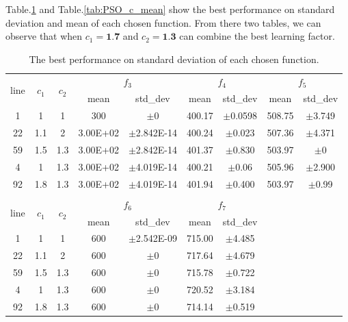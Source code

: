 \documentclass[letterpaper,12pt]{article}
\begin{document}
\par Table.\ref{tab:PSO_c_std} and Table.\ref{tab:PSO_c_mean} show the best performance on standard deviation and mean of each chosen function. From there two tables, we can observe that when $c_1 = \textbf{1.7}$ and $c_2 = \textbf{1.3}$ can combine the best learning factor.
\newpage
\begin{table}[!htb]
\centering
\begin{tabular}{|c|c|c|c|c|c|c|c|c|}
\hline
\multirow{2}{*}{line} & \multirow{2}{*}{$c_1$} & \multirow{2}{*}{$c_2$} & \multicolumn{2}{c|}{$f_3$} & \multicolumn{2}{c|}{$f_4$} & \multicolumn{2}{c|}{$f_5$}             \\ \cline{4-9} 
   &     &     & mean     & std\_dev       & mean   & std\_dev    & mean    & std\_dev    \\ \hline
1  & 1   & 1   & 300      & $\pm$0         & 400.17 & $\pm$0.0598 & 508.75  & $\pm$3.749  \\ \hline
22 & 1.1 & 2   & 3.00E+02 & $\pm$2.842E-14 & 400.24 & $\pm$0.023  & 507.36  & $\pm$4.371  \\ \hline
59 & 1.5 & 1.3 & 3.00E+02 & $\pm$2.842E-14 & 401.37 & $\pm$0.830  & 503.97  & $\pm$0      \\ \hline
4  & 1   & 1.3 & 3.00E+02 & $\pm$4.019E-14 & 400.21 & $\pm$0.06   & 505.96  & $\pm$2.900  \\ \hline
92 & 1.8 & 1.3 & 3.00E+02 & $\pm$4.019E-14 & 401.94 & $\pm$0.400  & 503.97  & $\pm$0.99   \\ \hline
   &     &     &          &                &        &             &         &             \\ \hline
\multirow{2}{*}{line} & \multirow{2}{*}{$c_1$} & \multirow{2}{*}{$c_2$} & \multicolumn{2}{c|}{$f_6$} & \multicolumn{2}{c|}{$f_7$} & \multicolumn{2}{c|}{\multirow{7}{*}{}} \\ \cline{4-7}
   &     &     & mean     & std\_dev       & mean   & std\_dev    & \multicolumn{2}{c|}{} \\ \cline{1-7}
1  & 1   & 1   & 600      & $\pm$2.542E-09 & 715.00 & $\pm$4.485  & \multicolumn{2}{c|}{} \\ \cline{1-7}
22 & 1.1 & 2   & 600      & $\pm$0         & 717.64 & $\pm$4.679  & \multicolumn{2}{c|}{} \\ \cline{1-7}
59 & 1.5 & 1.3 & 600      & $\pm$0         & 715.78 & $\pm$0.722  & \multicolumn{2}{c|}{} \\ \cline{1-7}
4  & 1   & 1.3 & 600      & $\pm$0         & 720.52 & $\pm$3.184  & \multicolumn{2}{c|}{} \\ \cline{1-7}
92 & 1.8 & 1.3 & 600      & $\pm$0         & 714.14 & $\pm$0.519  & \multicolumn{2}{c|}{} \\ \hline
\end{tabular}
\caption {The best performance on standard deviation of each chosen function.} 
\label{tab:PSO_c_std}
\end{table}
\end{document}
